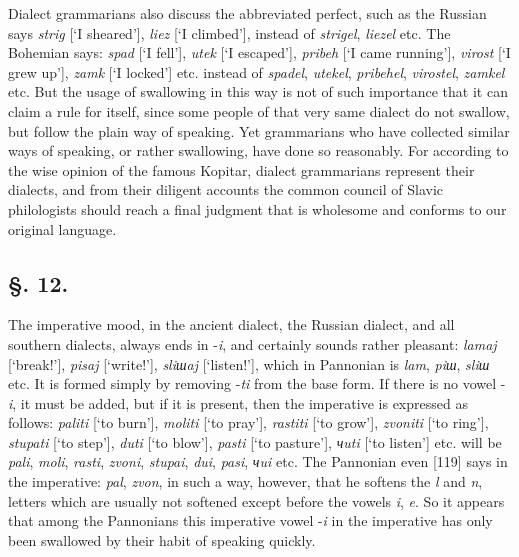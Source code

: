 Dialect grammarians also discuss the abbreviated perfect, such as the Russian says \textit{strig} [‘I sheared’], \textit{liez} [‘I climbed’], instead of \textit{strigel}, \textit{liezel} etc. The Bohemian says: \textit{spad} [‘I fell’], \textit{utek} [‘I escaped’], \textit{pribeh} [‘I came running’], \textit{virost} [‘I grew up’], \textit{zamk} [‘I locked’] etc. instead of \textit{spadel}, \textit{utekel}, \textit{pribehel}, \textit{virostel}, \textit{zamkel} etc. But the usage of swallowing in this way is not of such importance that it can claim a rule for itself, since some people of that very same dialect do not swallow, but follow the plain way of speaking. Yet grammarians who have collected similar ways of speaking, or rather swallowing, have done so reasonably. For according to the wise opinion of the famous Kopitar, dialect grammarians represent their dialects, and from their diligent accounts the common council of Slavic philologists should reach a final judgment that is wholesome and conforms to our original language.

\subsection*{\hspace*{\fill}§. 12.\hspace*{\fill}}

The imperative mood, in the ancient dialect, the Russian dialect, and all southern dialects, always ends in -\textit{i}, and certainly sounds rather pleasant: \textit{lamaj} [‘break!’], \textit{pisaj} [‘write!’], \textit{sliшaj} [‘listen!’], which in Pannonian is \textit{lam}, \textit{piш}, \textit{sliш} etc. It is formed simply by removing -\textit{ti} from the base form. If there is no vowel -\textit{i}, it must be added, but if it is present, then the imperative is expressed as follows: \textit{paliti} [‘to burn’], \textit{moliti} [‘to pray’], \textit{rastiti} [‘to grow’], \textit{zvoniti} [‘to ring’], \textit{stupati} [‘to step’], \textit{duti} [‘to blow’], \textit{pasti} [‘to pasture’], \textit{чuti} [‘to listen’] etc. will be \textit{pali}, \textit{moli}, \textit{rasti}, \textit{zvoni}, \textit{stupai}, \textit{dui}, \textit{pasi}, \textit{чui} etc. The Pannonian even [119] says in the imperative: \textit{pal}, \textit{zvon}, in such a way, however, that he softens the \textit{l} and \textit{n}, letters which are usually not softened except before the vowels \textit{i}, \textit{e}. So it appears that among the Pannonians this imperative vowel -\textit{i} in the imperative has only been swallowed by their habit of speaking quickly.

